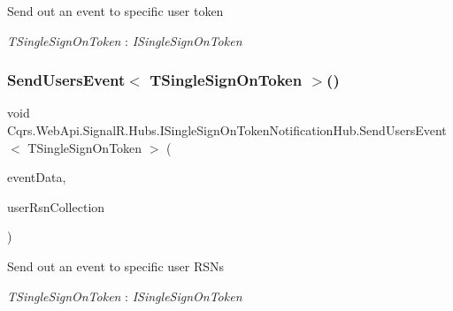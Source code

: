 Send out an event to specific user token 

\begin{Desc}
\item[Type Constraints]\begin{description}
\item[{\em T\+Single\+Sign\+On\+Token} : {\em I\+Single\+Sign\+On\+Token}]\end{description}
\end{Desc}
\mbox{\label{interfaceCqrs_1_1WebApi_1_1SignalR_1_1Hubs_1_1ISingleSignOnTokenNotificationHub_afe5b9561d3844b33e63082420666823e}} 
\subsubsection{\texorpdfstring{Send\+Users\+Event$<$ T\+Single\+Sign\+On\+Token $>$()}{SendUsersEvent< TSingleSignOnToken >()}}
{\footnotesize\ttfamily void Cqrs.\+Web\+Api.\+Signal\+R.\+Hubs.\+I\+Single\+Sign\+On\+Token\+Notification\+Hub.\+Send\+Users\+Event$<$ T\+Single\+Sign\+On\+Token $>$ (\begin{DoxyParamCaption}\item[{\hyperlink{interfaceCqrs_1_1Events_1_1IEvent}{I\+Event}$<$ T\+Single\+Sign\+On\+Token $>$}]{event\+Data,  }\item[{params Guid \mbox{[}$\,$\mbox{]}}]{user\+Rsn\+Collection }\end{DoxyParamCaption})}



Send out an event to specific user R\+S\+Ns 

\begin{Desc}
\item[Type Constraints]\begin{description}
\item[{\em T\+Single\+Sign\+On\+Token} : {\em I\+Single\+Sign\+On\+Token}]\end{description}
\end{Desc}

